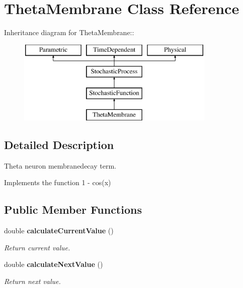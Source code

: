 \section{ThetaMembrane Class Reference}
\label{classThetaMembrane}
Inheritance diagram for ThetaMembrane::\begin{figure}[H]
\begin{center}
\leavevmode
\includegraphics[height=4cm]{classThetaMembrane}
\end{center}
\end{figure}


\subsection{Detailed Description}
Theta neuron membranedecay term. 

Implements the function 1 - cos(x) \subsection*{Public Member Functions}
\begin{CompactItemize}
\item 
double {\bf calculateCurrentValue} ()\label{classThetaMembrane_15b23c2fb50f98b664defba3e01f1644}

\begin{CompactList}\small\item\em Return current value. \item\end{CompactList}\item 
double {\bf calculateNextValue} ()\label{classThetaMembrane_3b19d44557265dc6e09a288793da45fb}

\begin{CompactList}\small\item\em Return next value. \item\end{CompactList}\end{CompactItemize}
